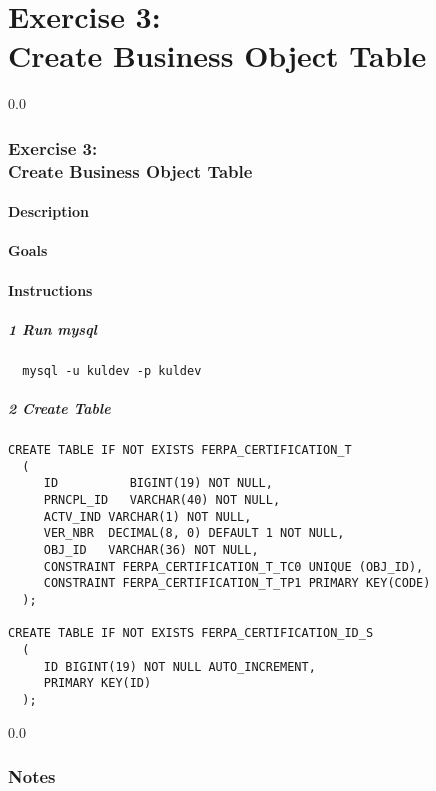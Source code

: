\part*{Exercise 3: \\
Create Business Object Table}

{\setlength{\baselineskip}%
  {0.0\baselineskip}
  \section*{\flushright Exercise 3: \\
Create Business Object Table}
  \hrulefill \par}

\subsection*{Description}

\subsection*{Goals}

\subsection*{Instructions}
\subsubsection*{1 Run mysql}
\begin{verbatim}
  mysql -u kuldev -p kuldev
\end{verbatim}

\subsubsection*{2 Create Table}
\begin{verbatim}
CREATE TABLE IF NOT EXISTS FERPA_CERTIFICATION_T
  (
     ID          BIGINT(19) NOT NULL,
     PRNCPL_ID   VARCHAR(40) NOT NULL,
     ACTV_IND VARCHAR(1) NOT NULL,
     VER_NBR  DECIMAL(8, 0) DEFAULT 1 NOT NULL,
     OBJ_ID   VARCHAR(36) NOT NULL,
     CONSTRAINT FERPA_CERTIFICATION_T_TC0 UNIQUE (OBJ_ID),
     CONSTRAINT FERPA_CERTIFICATION_T_TP1 PRIMARY KEY(CODE)
  );

CREATE TABLE IF NOT EXISTS FERPA_CERTIFICATION_ID_S
  (
     ID BIGINT(19) NOT NULL AUTO_INCREMENT,
     PRIMARY KEY(ID)
  );
\end{verbatim}
\newpage
{\setlength{\baselineskip}%
  {0.0\baselineskip}
  \section*{Notes}
  \hrulefill \par}